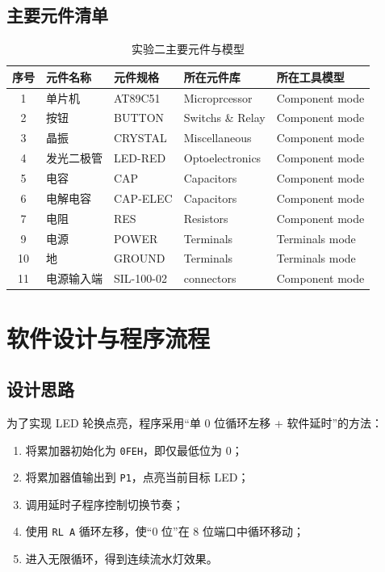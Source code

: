 \subsection{主要元件清单}
\begin{table}[H]
  \centering
  \caption{实验二主要元件与模型}
  \renewcommand{\arraystretch}{1.3}
  \begin{tabular}{cllll}
    \toprule
    序号 & 元件名称 & 元件规格 & 所在元件库 & 所在工具模型 \\
    \midrule
    1 & 单片机 & AT89C51 & Microprcessor & Component mode \\
    2 & 按钮 & BUTTON & Switchs \& Relay & Component mode \\
    3 & 晶振 & CRYSTAL & Miscellaneous & Component mode \\
    4 & 发光二极管 & LED-RED & Optoelectronics & Component mode \\
    5 & 电容 & CAP & Capacitors & Component mode \\
    6 & 电解电容 & CAP-ELEC & Capacitors & Component mode \\
    7 & 电阻 & RES & Resistors & Component mode \\
    9 & 电源 & POWER & Terminals & Terminals mode \\
    10 & 地 & GROUND & Terminals & Terminals mode \\
    11 & 电源输入端 & SIL-100-02 & connectors & Component mode \\
    \bottomrule
  \end{tabular}
\end{table}

\section{软件设计与程序流程}

\subsection{设计思路}
为了实现 LED 轮换点亮，程序采用“单 0 位循环左移 + 软件延时”的方法：
\begin{enumerate}
  \item 将累加器初始化为 \texttt{0FEH}，即仅最低位为 0；
  \item 将累加器值输出到 \texttt{P1}，点亮当前目标 LED；
  \item 调用延时子程序控制切换节奏；
  \item 使用 \texttt{RL A} 循环左移，使“0 位”在 8 位端口中循环移动；
  \item 进入无限循环，得到连续流水灯效果。
\end{enumerate}

